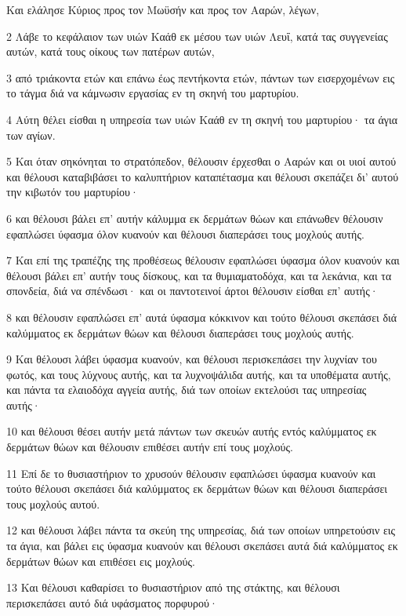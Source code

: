 \par Και ελάλησε Κύριος προς τον Μωϋσήν και προς τον Ααρών, λέγων,
\par 2 Λάβε το κεφάλαιον των υιών Καάθ εκ μέσου των υιών Λευΐ, κατά τας συγγενείας αυτών, κατά τους οίκους των πατέρων αυτών,
\par 3 από τριάκοντα ετών και επάνω έως πεντήκοντα ετών, πάντων των εισερχομένων εις το τάγμα διά να κάμνωσιν εργασίας εν τη σκηνή του μαρτυρίου.
\par 4 Αύτη θέλει είσθαι η υπηρεσία των υιών Καάθ εν τη σκηνή του μαρτυρίου· τα άγια των αγίων.
\par 5 Και όταν σηκόνηται το στρατόπεδον, θέλουσιν έρχεσθαι ο Ααρών και οι υιοί αυτού και θέλουσι καταβιβάσει το καλυπτήριον καταπέτασμα και θέλουσι σκεπάζει δι' αυτού την κιβωτόν του μαρτυρίου·
\par 6 και θέλουσι βάλει επ' αυτήν κάλυμμα εκ δερμάτων θώων και επάνωθεν θέλουσιν εφαπλώσει ύφασμα όλον κυανούν και θέλουσι διαπεράσει τους μοχλούς αυτής.
\par 7 Και επί της τραπέζης της προθέσεως θέλουσιν εφαπλώσει ύφασμα όλον κυανούν και θέλουσι βάλει επ' αυτήν τους δίσκους, και τα θυμιαματοδόχα, και τα λεκάνια, και τα σπονδεία, διά να σπένδωσι· και οι παντοτεινοί άρτοι θέλουσιν είσθαι επ' αυτής·
\par 8 και θέλουσιν εφαπλώσει επ' αυτά ύφασμα κόκκινον και τούτο θέλουσι σκεπάσει διά καλύμματος εκ δερμάτων θώων και θέλουσι διαπεράσει τους μοχλούς αυτής.
\par 9 Και θέλουσι λάβει ύφασμα κυανούν, και θέλουσι περισκεπάσει την λυχνίαν του φωτός, και τους λύχνους αυτής, και τα λυχνοψάλιδα αυτής, και τα υποθέματα αυτής, και πάντα τα ελαιοδόχα αγγεία αυτής, διά των οποίων εκτελούσι τας υπηρεσίας αυτής·
\par 10 και θέλουσι θέσει αυτήν μετά πάντων των σκευών αυτής εντός καλύμματος εκ δερμάτων θώων και θέλουσιν επιθέσει αυτήν επί τους μοχλούς.
\par 11 Επί δε το θυσιαστήριον το χρυσούν θέλουσιν εφαπλώσει ύφασμα κυανούν και τούτο θέλουσι σκεπάσει διά καλύμματος εκ δερμάτων θώων και θέλουσι διαπεράσει τους μοχλούς αυτού.
\par 12 και θέλουσι λάβει πάντα τα σκεύη της υπηρεσίας, διά των οποίων υπηρετούσιν εις τα άγια, και βάλει εις ύφασμα κυανούν και θέλουσι σκεπάσει αυτά διά καλύμματος εκ δερμάτων θώων και επιθέσει εις μοχλούς.
\par 13 Και θέλουσι καθαρίσει το θυσιαστήριον από της στάκτης, και θέλουσι περισκεπάσει αυτό διά υφάσματος πορφυρού·
